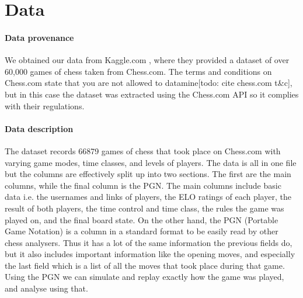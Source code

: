 \documentclass[11pt,a4paper]{article}
\begin{document}
\section{Data}


\paragraph{Data provenance}
We obtained our data from Kaggle.com \cite{Kaggle}, where they provided a dataset of over 60,000 games of chess taken from Chess.com. The terms and conditions on Chess.com state that you are not allowed to datamine[todo: cite chess.com t\&c], but in this case the dataset was extracted using the Chess.com API so it complies with their regulations.

\paragraph{Data description}
The dataset records 66879 games of chess that took place on Chess.com with varying game modes, time classes, and levels of players. The data is all in one file but the columns are effectively split up into two sections. The first are the main columns, while the final column is the PGN. The main columns include basic data i.e. the usernames and links of players, the ELO ratings of each player, the result of both players, the time control and time class, the rules the game was played on, and the final board state. On the other hand, the PGN (Portable Game Notation) is a column in a standard format to be easily read by other chess analysers. Thus it has a lot of the same information the previous fields do, but it also includes important information like the opening moves, and especially the last field which is a list of all the moves that took place during that game. Using the PGN we can simulate and replay exactly how the game was played, and analyse using that.

\end{document}
